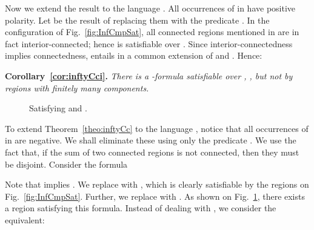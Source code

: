 \documentclass{article}
\newenvironment{swetheorem}[1]{\par\medskip\noindent\textbf{#1.}\hspace*{0.5em}\em}{\par\smallskip}
\begin{document}
Now we extend the result to the language . All occurrences of
 in  have positive polarity.  Let 
be the result of replacing them with the predicate . In the
configuration of Fig.~\ref{fig:InfCmpSat}, all connected regions
mentioned in  are in fact interior-connected; hence
 is satisfiable over . Since
interior-connectedness implies connectedness, 
entails  in a common extension of  and
. Hence:
\begin{swetheorem}{Corollary~\ref{cor:inftyCci}}
There is a -formula satisfiable over , ,
but not by regions with finitely many components.
\end{swetheorem}
\begin{figure}[h]
\begin{center}
\end{center}
	\caption{Satisfying  and .}
	\label{fig:InfCmpElAiBi}	
\end{figure}
To extend Theorem~\ref{theo:inftyCc} to the language , 
notice that all occurrences of  in  are negative.
We shall eliminate these using only the predicate . We use
the fact that, if the sum of two connected regions is not 
connected, then they must be disjoint. Consider the formula 

Note that  implies .  We
replace  with , which is clearly satisfiable by the
regions on Fig.~\ref{fig:InfCmpSat}. Further, we replace  with . As shown
on Fig.~\ref{fig:InfCmpElAiBi}, there exists a region  satisfying
this formula.  Instead of dealing with , we
consider the equivalent:
\end{document}
